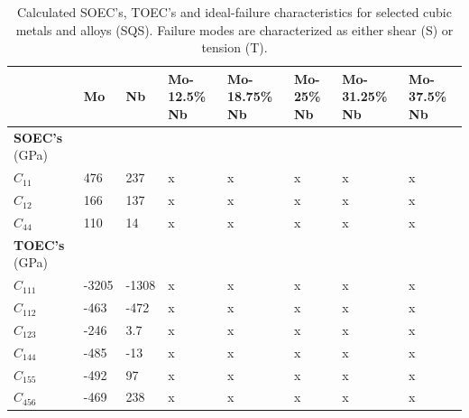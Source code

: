 \documentclass[showpacs,aps,floatfix,prb,reprint,superscriptaddress]{revtex4-1}
\begin{document}
\begin{table}
\caption{\label{tab:cubic_properties_total} Calculated SOEC's, TOEC's and ideal-failure characteristics for selected cubic metals and alloys (SQS). Failure modes are characterized as either shear (S) or tension (T).}
\begin{ruledtabular}
\begin{tabular}{l l l l l l l l}
 & Mo & Nb & Mo-12.5\% Nb & Mo-18.75\% Nb & Mo-25\% Nb & Mo-31.25\% Nb & Mo-37.5\% Nb  \\
\hline
\textbf{SOEC's} (GPa) & & & & & & & \\
$C_{11}$ & 476 & 237 & x & x & x & x & x \\
$C_{12}$ & 166 & 137 & x & x & x & x & x \\
$C_{44}$ & 110 & 14 & x & x & x & x & x \\
\hline
\textbf{TOEC's} (GPa) & & & & & & & \\
$C_{111}$ & -3205 & -1308 & x & x & x & x & x \\
$C_{112}$ & -463 & -472 & x & x & x & x & x \\
$C_{123}$ & -246 & 3.7 & x & x & x & x & x \\
$C_{144}$ & -485 & -13 & x & x & x & x & x \\
$C_{155}$ & -492 & 97 & x & x & x & x & x \\
$C_{456}$ & -469 & 238 & x & x & x & x & x \\
\hline
\end{tabular}
\end{ruledtabular}
\end{table}
\end{document}
